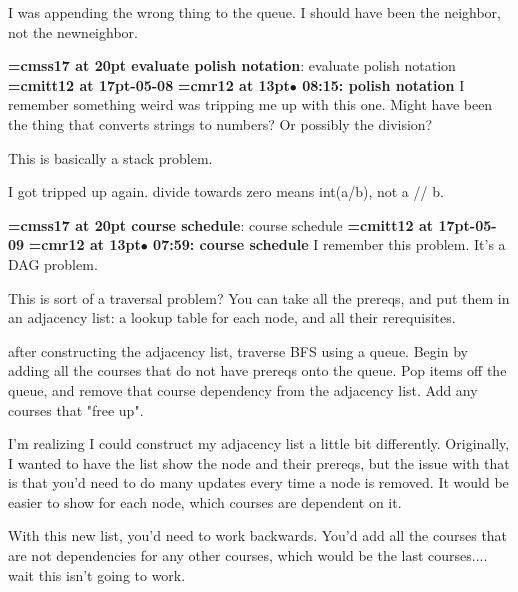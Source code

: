 I was appending the wrong thing to the queue. I should have been the neighbor, not the newneighbor.
\par

{\medskip\noindent\bf\font\titlefont=cmss17 at 20pt evaluate polish notation}: evaluate polish notation
{\medskip\noindent\bf\font\titlefont=cmitt12 at 17pt-05-08}\medskip
{\smallskip\noindent\bf\font\titlefont=cmr12 at 13pt\titlefont $\bullet$ 08:15: polish notation}\smallskip
I remember something weird was tripping me up with this one. Might have been the thing that converts strings to numbers? Or possibly the division?
\par

This is basically a stack problem.
\par

I got tripped up again. divide towards zero means int(a/b), not a // b.
\par

{\medskip\noindent\bf\font\titlefont=cmss17 at 20pt course schedule}: course schedule
{\medskip\noindent\bf\font\titlefont=cmitt12 at 17pt-05-09}\medskip
{\smallskip\noindent\bf\font\titlefont=cmr12 at 13pt\titlefont $\bullet$ 07:59: course schedule}\smallskip
I remember this problem. It's a DAG problem.
\par

This is sort of a traversal problem? You can take all the prereqs, and put them in an adjacency list: a lookup table for each node, and all their rerequisites.
\par

after constructing the adjacency list, traverse BFS using a queue. Begin by adding all the courses that do not have prereqs onto the queue. Pop items off the queue, and remove that course dependency from the adjacency list. Add any courses that "free up".
\par

I'm realizing I could construct my adjacency list a little bit differently. Originally, I wanted to have the list show the node and their prereqs, but the issue with that is that you'd need to do many updates every time a node is removed. It would be easier to show for each node, which courses are dependent on it.
\par

With this new list, you'd need to work backwards. You'd add all the courses that are not dependencies for any other courses, which would be the last courses.... wait this isn't going to work.
\par

